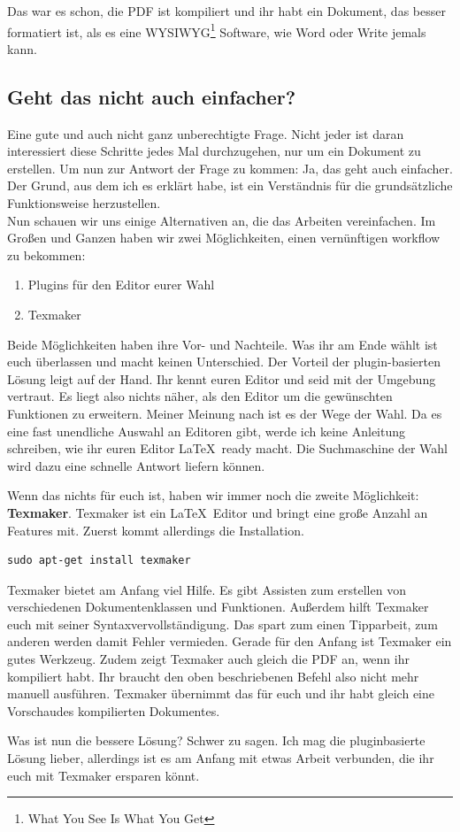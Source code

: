 \documentclass[a4paper,11pt]{scrartcl}	%
\begin{document}
	Das war es schon, die PDF ist kompiliert und ihr habt ein Dokument, das besser formatiert ist, als es eine
	WYSIWYG\footnote{What You See Is What You Get} Software, wie Word oder Write jemals kann.

	\subsection{Geht das nicht auch einfacher?}
	Eine gute und auch nicht ganz unberechtigte Frage. Nicht jeder ist daran interessiert diese Schritte jedes Mal 
	durchzugehen, nur um ein Dokument zu erstellen. Um nun zur Antwort der Frage zu kommen: Ja, das geht auch einfacher.
	Der Grund, aus dem ich es erklärt habe, ist ein Verständnis für die grundsätzliche Funktionsweise herzustellen.\\[0.5cm]
	Nun schauen wir uns einige Alternativen an, die das Arbeiten vereinfachen. Im Großen und Ganzen haben wir zwei 
	Möglichkeiten, einen vernünftigen workflow zu bekommen:

		\begin{enumerate}
			\item Plugins für den Editor eurer Wahl
			\item Texmaker
		\end{enumerate}

	Beide Möglichkeiten haben ihre Vor- und Nachteile. Was ihr am Ende wählt ist euch überlassen und macht keinen
	Unterschied. Der Vorteil der plugin-basierten Lösung leigt auf der Hand. Ihr kennt euren Editor und seid mit der 
	Umgebung vertraut. Es liegt also  nichts näher, als den Editor um die gewünschten Funktionen zu erweitern.
	Meiner Meinung nach ist es der Wege der Wahl. Da es eine fast unendliche Auswahl an Editoren gibt, werde ich keine
	Anleitung schreiben, wie ihr euren Editor \LaTeX\ ready macht. Die Suchmaschine der Wahl wird dazu eine schnelle
	Antwort liefern können.\par
	Wenn das nichts für euch ist, haben wir immer noch die zweite Möglichkeit: \textbf{Texmaker}. Texmaker ist ein
	\LaTeX\ Editor und bringt eine große Anzahl an Features mit. Zuerst kommt allerdings die Installation.

		\begin{lstlisting}[frame=single]
sudo apt-get install texmaker
		\end{lstlisting}

	Texmaker bietet am Anfang viel Hilfe. Es gibt Assisten zum erstellen von verschiedenen Dokumentenklassen und 
	Funktionen. Außerdem hilft Texmaker euch mit seiner Syntaxvervollständigung. Das spart zum einen Tipparbeit, zum
	anderen werden damit Fehler vermieden. Gerade für den Anfang ist Texmaker ein gutes Werkzeug. Zudem zeigt Texmaker
	auch gleich die PDF an, wenn ihr kompiliert habt. Ihr braucht den oben beschriebenen Befehl also nicht mehr manuell
	ausführen. Texmaker übernimmt das für euch und ihr habt gleich eine Vorschaudes kompilierten Dokumentes.\par
	Was ist nun die bessere Lösung? Schwer zu sagen. Ich mag die pluginbasierte Lösung lieber, allerdings ist es am 
	Anfang mit etwas Arbeit verbunden, die ihr euch mit Texmaker ersparen könnt.
\end{document}
